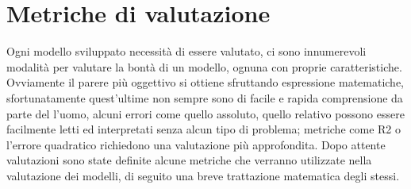 \documentclass[%
    corpo=12pt,
    twoside,
    oldstyle,
    autoretitolo,
    greek,
    evenboxes,
]{toptesi}
\begin{document}
\section{Metriche di valutazione}
Ogni modello sviluppato necessità di essere valutato, ci sono innumerevoli modalità per valutare la bontà di un modello, ognuna con proprie caratteristiche. Ovviamente il parere più oggettivo si ottiene sfruttando espressione matematiche, sfortunatamente quest'ultime non sempre sono di facile e rapida comprensione da parte del l'uomo, alcuni errori come quello assoluto, quello relativo possono essere facilmente letti ed interpretati senza alcun tipo di problema; metriche come R2 o l'errore quadratico richiedono una valutazione più approfondita. Dopo attente valutazioni sono state definite alcune metriche che verranno utilizzate nella valutazione dei modelli, di seguito una breve trattazione matematica degli stessi.\\
\end{document}
